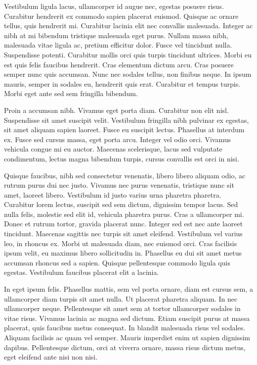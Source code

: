 Vestibulum ligula lacus, ullamcorper id augue nec, egestas posuere risus. Curabitur hendrerit ex commodo sapien placerat euismod. Quisque ac ornare tellus, quis hendrerit mi. Curabitur lacinia elit nec convallis malesuada. Integer ac nibh at mi bibendum tristique malesuada eget purus. Nullam massa nibh, malesuada vitae ligula ac, pretium efficitur dolor. Fusce vel tincidunt nulla. Suspendisse potenti. Curabitur mollis orci quis turpis tincidunt ultrices. Morbi eu est quis felis faucibus hendrerit. Cras elementum dictum arcu. Cras posuere semper nunc quis accumsan. Nunc nec sodales tellus, non finibus neque. In ipsum mauris, semper in sodales eu, hendrerit quis erat. Curabitur et tempus turpis. Morbi eget ante sed sem fringilla bibendum.

Proin a accumsan nibh. Vivamus eget porta diam. Curabitur non elit nisl. Suspendisse sit amet suscipit velit. Vestibulum fringilla nibh pulvinar ex egestas, sit amet aliquam sapien laoreet. Fusce eu suscipit lectus. Phasellus at interdum ex. Fusce sed cursus massa, eget porta arcu. Integer vel odio orci. Vivamus vehicula congue mi eu auctor. Maecenas scelerisque, lacus sed vulputate condimentum, lectus magna bibendum turpis, cursus convallis est orci in nisi.

Quisque faucibus, nibh sed consectetur venenatis, libero libero aliquam odio, ac rutrum purus dui nec justo. Vivamus nec purus venenatis, tristique nunc sit amet, laoreet libero. Vestibulum id justo varius urna pharetra pharetra. Curabitur lorem lectus, suscipit sed sem dictum, dignissim tempor lacus. Sed nulla felis, molestie sed elit id, vehicula pharetra purus. Cras a ullamcorper mi. Donec et rutrum tortor, gravida placerat nunc. Integer sed est nec ante laoreet tincidunt. Maecenas sagittis nec turpis sit amet eleifend. Vestibulum vel varius leo, in rhoncus ex. Morbi ut malesuada diam, nec euismod orci. Cras facilisis ipsum velit, eu maximus libero sollicitudin in. Phasellus eu dui sit amet metus accumsan rhoncus sed a sapien. Quisque pellentesque commodo ligula quis egestas. Vestibulum faucibus placerat elit a lacinia.

In eget ipsum felis. Phasellus mattis, sem vel porta ornare, diam est cursus sem, a ullamcorper diam turpis sit amet nulla. Ut placerat pharetra aliquam. In nec ullamcorper neque. Pellentesque sit amet sem at tortor ullamcorper sodales in vitae risus. Vivamus lacinia ac magna sed dictum. Etiam suscipit purus at massa placerat, quis faucibus metus consequat. In blandit malesuada risus vel sodales. Aliquam facilisis ac quam vel semper. Mauris imperdiet enim ut sapien dignissim dapibus. Pellentesque dictum, orci at viverra ornare, massa risus dictum metus, eget eleifend ante nisi non nisi.

